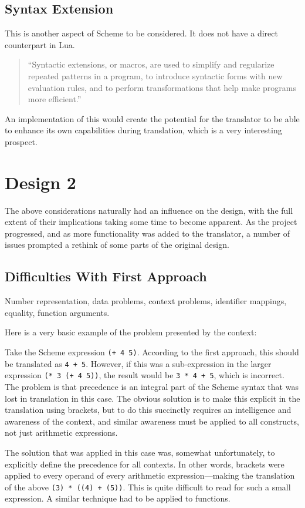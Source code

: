 \subsection{Syntax Extension}

This is another aspect of Scheme to be considered. It does not have a direct
counterpart in Lua.

\begin{quotation}
``Syntactic extensions, or macros, are used to simplify and regularize repeated
patterns in a program, to introduce syntactic forms with new evaluation rules,
and to perform transformations that help make programs more
efficient.''~\cite[Ch~8]{tspl}
\end{quotation}

An implementation of this would create the potential for the translator to be
able to enhance its own capabilities during translation, which is a very
interesting prospect.


\section{Design 2}

The above considerations naturally had an influence on the design, with the full
extent of their implications taking some time to become apparent. As the
project progressed, and as more functionality was added to the translator, a
number of issues prompted a rethink of some parts of the original design.

\subsection{Difficulties With First Approach}

Number representation, data problems, context problems, identifier mappings,
equality, function arguments.

Here is a very basic example of the problem presented by the context:
\begin{framed}
Take the Scheme expression \texttt{(+ 4 5)}. According to the first approach,
this should be translated as \texttt{4 + 5}. However, if this was a
sub-expression in the larger expression \texttt{(*~3~(+~4~5))}, the result would
be \texttt{3~*~4~+~5}, which is incorrect. The problem is that precedence is
an integral part of the Scheme syntax that was lost in translation in this case.
The obvious solution is to make this explicit in the translation using brackets,
but to do this succinctly requires an intelligence and awareness of the context,
and similar awareness must be applied to all constructs, not just arithmetic
expressions.
\end{framed}
The solution that was applied in this case was, somewhat unfortunately, to
explicitly define the precedence for all contexts. In other words, brackets were
applied to every operand of every arithmetic expression---making the translation
of the above \texttt{(3) * ((4) + (5))}. This is quite difficult to read for
such a small expression. A similar technique had to be applied to functions.


